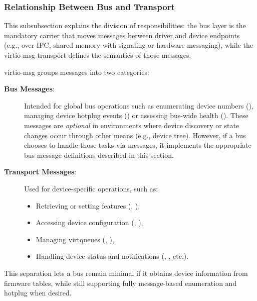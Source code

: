 \subsubsection{Relationship Between Bus and Transport}
\label{sec:Virtio Transport Options / Virtio Over Messages / Basic Concepts / Relationship between bus and transport}

This subsubsection explains the division of responsibilities: the bus layer is
the mandatory carrier that moves messages between driver and device endpoints
(e.g., over IPC, shared memory with signaling or hardware messaging), while
the virtio-msg transport defines the semantics of those messages.

virtio-msg groups messages into two categories:

\begin{description}
  \item[\textbf{Bus Messages}:]
    Intended for global bus operations such as enumerating device numbers
    (), managing device hotplug events ()
    or assessing bus-wide health ().
    These messages are \emph{optional} in environments where
    device discovery or state changes occur through other means (e.g., device
    tree). However, if a bus chooses to handle those tasks via messages,
    it implements the appropriate bus message definitions described in this
    section.

  \item[\textbf{Transport Messages}:]
    Used for device-specific operations, such as:
    \begin{itemize}
      \item Retrieving or setting features (,
        ),
      \item Accessing device configuration (,
        ),
      \item Managing virtqueues (, ),
      \item Handling device status and notifications (,
        , etc.).
    \end{itemize}
\end{description}

This separation lets a bus remain minimal if it obtains device information from
firmware tables, while still supporting fully message-based enumeration and
hotplug when desired.


